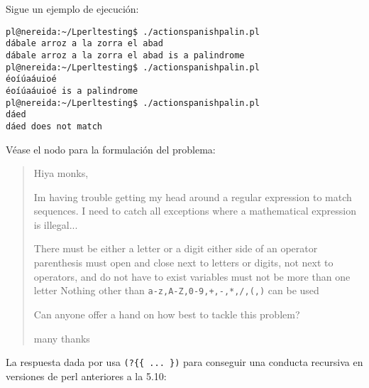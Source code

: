 Sigue un ejemplo de ejecución:

\begin{latexonly}
\begin{verbatim}
pl@nereida:~/Lperltesting$ ./actionspanishpalin.pl 
dábale arroz a la zorra el abad
dábale arroz a la zorra el abad is a palindrome
pl@nereida:~/Lperltesting$ ./actionspanishpalin.pl 
éoíúaáuioé
éoíúaáuioé is a palindrome
pl@nereida:~/Lperltesting$ ./actionspanishpalin.pl 
dáed
dáed does not match
\end{verbatim}
\end{latexonly}



Véase el nodo 
para la formulación del problema:

\begin{it}\begin{quotation} 
Hiya monks,

Im having trouble getting my head around a regular expression to match sequences.
I need to catch all exceptions where a mathematical expression is illegal...

There must be either a letter or a digit either side of an operator
parenthesis must open and close next to letters or digits, not next to operators, and do not have to exist
variables must not be more than one letter
Nothing other than \verb|a-z,A-Z,0-9,+,-,*,/,(,)| can be used

Can anyone offer a hand on how best to tackle this problem?

many thanks 
\end{quotation}\end{it} 

La respuesta dada por  usa \verb|(?{{ ... })|
para conseguir una conducta recursiva en versiones de perl anteriores a la 5.10:

